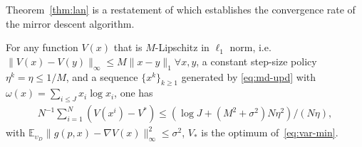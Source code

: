 
Theorem~\ref{thm:lan} is a restatement of \cite[Theorem 4.1.]{lan2020first} which establishes the convergence rate of the mirror descent algorithm. 

\begin{theorem}\label{thm:lan}
    For any function $V(x)$ that is $M$-Lipschitz in $\ell_1$ norm, i.e. $\|V(x) - V(y)\|_\infty \le M \|x-y\|_1 \forall x,y$, a constant step-size policy $\eta^k = \eta \le 1/M$, and 
    a sequence $\{x^k\}_{k\ge 1}$ generated by \eqref{eq:md-upd} with $\omega(x) = \sum_{i\le J} x_i\log x_i$, one has
    \begin{align*}
        N^{-1}\sum_{i=1}^N (V(x^i)  - V^*) \le 
        (\log J + (M^2 + \sigma^2) N \eta^2)/(N\eta),
    \end{align*}
with $\mathbb{E}_{\upsilon_D}\|g(p,x)- \nabla V(x)\|_\infty^2 \le \sigma^2$, $V_*$ is the optimum of~\eqref{eq:var-min}. 
\end{theorem}

